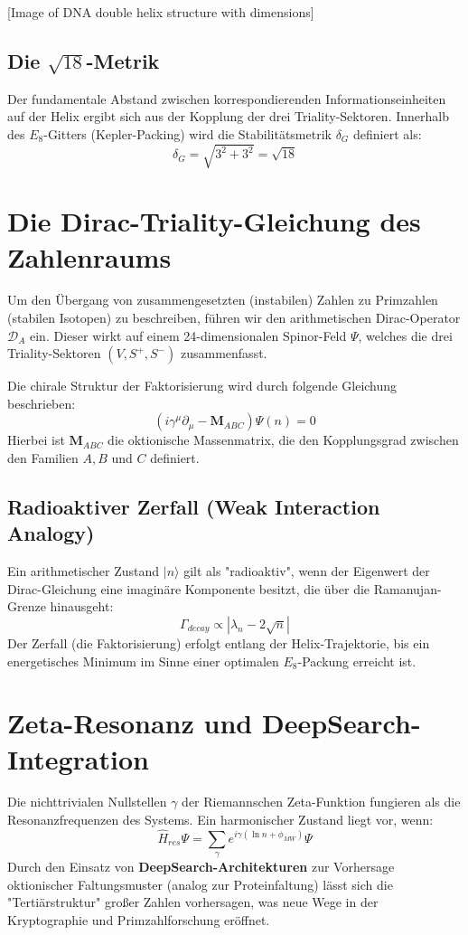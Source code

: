 \documentclass[11pt,a4paper]{article}
\begin{document}
	[Image of DNA double helix structure with dimensions]
	
	
	\subsection{Die $\sqrt{18}$-Metrik}
	Der fundamentale Abstand zwischen korrespondierenden Informationseinheiten auf der Helix ergibt sich aus der Kopplung der drei Triality-Sektoren. Innerhalb des $E_8$-Gitters (Kepler-Packing) wird die Stabilitätsmetrik $\delta_{G}$ definiert als:
	\begin{equation}
		\delta_{G} = \sqrt{3^2 + 3^2} = \sqrt{18}
	\end{equation}
	
	\section{Die Dirac-Triality-Gleichung des Zahlenraums}
	Um den Übergang von zusammengesetzten (instabilen) Zahlen zu Primzahlen (stabilen Isotopen) zu beschreiben, führen wir den arithmetischen Dirac-Operator $\mathcal{D}_A$ ein. Dieser wirkt auf einem 24-dimensionalen Spinor-Feld $\Psi$, welches die drei Triality-Sektoren $(V, S^+, S^-)$ zusammenfasst.
	
	Die chirale Struktur der Faktorisierung wird durch folgende Gleichung beschrieben:
	\begin{equation}
		\left( i \gamma^\mu \partial_\mu - \mathbf{M}_{ABC} \right) \Psi(n) = 0
	\end{equation}
	Hierbei ist $\mathbf{M}_{ABC}$ die oktionische Massenmatrix, die den Kopplungsgrad zwischen den Familien $A, B$ und $C$ definiert. 
	
	\subsection{Radioaktiver Zerfall (Weak Interaction Analogy)}
	Ein arithmetischer Zustand $|n\rangle$ gilt als "radioaktiv", wenn der Eigenwert der Dirac-Gleichung eine imaginäre Komponente besitzt, die über die Ramanujan-Grenze hinausgeht:
	\begin{equation}
		\Gamma_{decay} \propto |\lambda_n - 2\sqrt{n}|
	\end{equation}
	Der Zerfall (die Faktorisierung) erfolgt entlang der Helix-Trajektorie, bis ein energetisches Minimum im Sinne einer optimalen $E_8$-Packung erreicht ist.
	
	\section{Zeta-Resonanz und DeepSearch-Integration}
	Die nichttrivialen Nullstellen $\gamma$ der Riemannschen Zeta-Funktion fungieren als die Resonanzfrequenzen des Systems. Ein harmonischer Zustand liegt vor, wenn:
	\begin{equation}
		\hat{H}_{res} \Psi = \sum_{\gamma} e^{i \gamma (\ln n + \phi_{MW})} \Psi
	\end{equation}
	Durch den Einsatz von \textbf{DeepSearch-Architekturen} zur Vorhersage oktionischer Faltungsmuster (analog zur Proteinfaltung) lässt sich die "Tertiärstruktur" großer Zahlen vorhersagen, was neue Wege in der Kryptographie und Primzahlforschung eröffnet.
	
\end{document}

